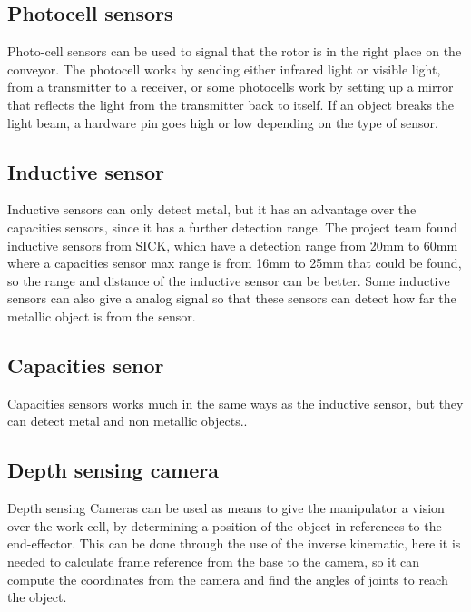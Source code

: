  
  \subsection{Photocell sensors} 
  Photo-cell sensors can be used to signal that the rotor is in the right place on the conveyor. The photocell works by sending either infrared light or visible light, from a transmitter to a receiver, or some photocells work by setting up a mirror that reflects the light from the transmitter back to itself. If an object breaks the light beam, a hardware pin goes high or low depending on the type of sensor\cite{SICKfo}. \\

 \subsection{Inductive sensor}
 Inductive sensors can only detect metal, but it has an advantage over the capacities sensors, since it has a further detection range. The project team found inductive sensors from SICK, which have a detection range from 20mm to 60mm \cite{SICKin} where a capacities sensor max range is from 16mm to 25mm \cite{SICKka} that could be found, so the range and distance of the inductive sensor can be better. Some inductive sensors can also give a analog signal so that these sensors can detect how far the metallic object is from the sensor\cite{SICKin}.\\ 

 \subsection{Capacities senor} 
 Capacities sensors works much in the same ways as the inductive sensor, but they can detect metal and non metallic objects.\cite{SICKka}.\\

 \subsection{Depth sensing camera} \label{depthcam}
 Depth sensing Cameras can be used as means to give the manipulator a vision over the work-cell, by determining a position of the object in references to the end-effector\cite{cam}. This can be done through the use of the inverse kinematic, here it is needed to calculate frame reference from the base to the camera, so it can compute the coordinates from the camera and find the angles of joints to reach the object\cite{JohnC}.\\
 

